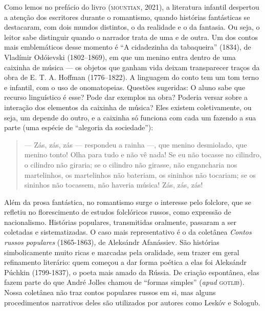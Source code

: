 \documentclass[11pt]{extarticle}
\begin{document}
Como lemos no prefácio do livro (\textsc{mountian}, 2021), a literatura
infantil despertou a atenção dos escritores durante o romantismo, quando
histórias fantásticas se destacaram, com dois mundos distintos, o da
realidade e o da fantasia. Ou seja, o leitor sabe distinguir quando o
narrador trata de uma e de outra. Um dos contos mais emblemáticos desse
momento é ``A cidadezinha da tabaqueira'' (1834), de Vladímir Odóievski
(1802--1869), em que um menino entra dentro de uma caixinha de música
--- os objetos que ganham vida deixam transparecer traços da obra de E.
T. A. Hoffman (1776--1822). A linguagem do conto tem um tom terno e
infantil, com o uso de onomatopeias. Questões sugeridas: O aluno sabe
que recurso linguístico é esse? Pode dar exemplos na obra? Poderia
versar sobre a interação dos elementos da caixinha de música? Eles
existem coletivamente, ou seja, um depende do outro, e a caixinha só
funciona com cada um fazendo a sua parte (uma espécie de ``alegoria da
sociedade''):

\begin{quote}
--- Zás, zás, zás --- respondeu a rainha ---, que menino desmiolado, que
menino tonto! Olha para tudo e não vê nada! Se eu não tocasse no
cilindro, o cilindro não giraria; se o cilindro não girasse, não
engancharia nos martelinhos, os martelinhos não bateriam, os sininhos
não tocariam; se os sininhos não tocassem, não haveria música! Zás, zás,
zás!

\end{quote}


Além da prosa fantástica, no romantismo surge o interesse pelo
folclore, que se refletiu no florescimento de estudos folclóricos
russos, como expressão de nacionalismo. Histórias populares,
transmitidas oralmente, passaram a ser coletadas e sistematizadas. O caso
mais representativo é o da coletânea \emph{Contos russos populares}
(1865-1863)\emph{,} de Aleksándr Afanássiev. São histórias
simbolicamente muito ricas e marcadas pela oralidade, sem trazer em
geral refinamento literário: quem começou a dar forma poética a elas foi
Aleksándr Púchkin (1799-1837), o poeta mais amado da Rússia. De criação
espontânea, elas fazem parte do que André Jolles chamou de ``formas
simples'' (\emph{apud} \textsc{gotlib}). Nossa coletânea não traz contos
populares russos em si, mas alguns procedimentos narrativos deles são
utilizados por autores como Leskóv e Sologub. 
\end{document}
